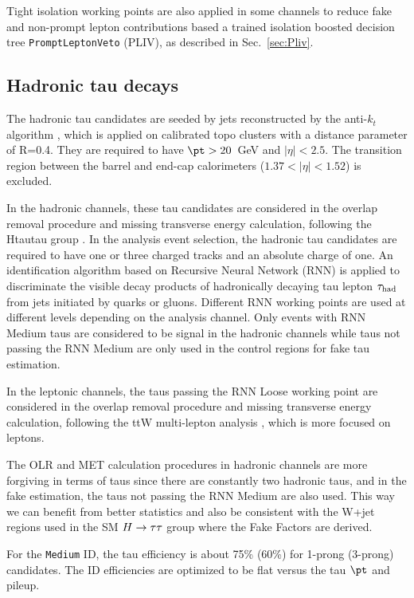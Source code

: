 Tight isolation working points are also applied in some channels to reduce fake and non-prompt lepton contributions based a trained isolation boosted decision tree \texttt{PromptLeptonVeto} 
(PLIV), as described in Sec.~\ref{sec:Pliv}.

\subsection{Hadronic tau decays}
\label{sec:taurecon}
The hadronic tau candidates \cite{tau_sys1} are seeded by jets reconstructed by the anti-$k_t$ algorithm \cite{antikt}, which is applied on calibrated topo clusters \cite{topocluster} with a distance parameter of R=0.4. They are required to have $\pt > 20$~GeV and $|\eta|<2.5$. The transition region between the barrel and end-cap calorimeters ($1.37<|\eta|<1.52$) is excluded.

In the hadronic channels, these tau candidates are considered in the overlap removal procedure and missing transverse energy calculation, following the Htautau group \cite{Htautau-note}. In the analysis event selection, the hadronic tau candidates are required to have one or three charged tracks and an absolute charge of one. An identification algorithm based on Recursive Neural Network (RNN) \cite{tau_sys2} is applied to discriminate the visible decay products of hadronically decaying tau lepton $\tau_\text{had}$ from jets initiated by quarks or gluons. Different RNN working points are used at different levels depending on the analysis channel. Only events with RNN Medium taus are considered to be signal in the hadronic channels while taus not passing the RNN Medium are only used in the control regions for fake tau estimation.

In the leptonic channels, the taus passing the RNN Loose working point are considered in the overlap removal procedure and missing transverse energy calculation, following the ttW multi-lepton analysis \cite{ttHMLgroup}, which is more focused on leptons.

The OLR and MET calculation procedures in hadronic channels are more forgiving in terms of taus since there are constantly two hadronic taus, and in the fake estimation, the taus not passing the RNN Medium are also used. This way we can benefit from better statistics and also be consistent with the W+jet regions used in the SM $H \rightarrow \tau\tau$ group where the Fake Factors are derived.

For the \texttt{Medium} ID, the tau efficiency is about 75\% (60\%) for 1-prong (3-prong) candidates. The ID efficiencies are optimized to be flat versus the tau $\pt$ and pileup.

